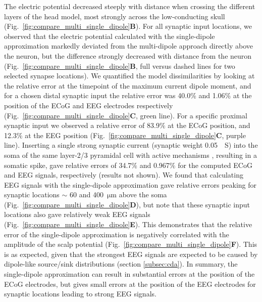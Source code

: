 \documentclass[preprint,10pt,authoryear]{elsarticle}
\newcommand{\newtxt}[1]{{\color{Red}#1}}
\begin{document}
The electric potential decreased steeply with distance when crossing the different layers of the head model, most strongly across the low-conducting skull (Fig.~\ref{fig:compare_multi_single_dipole}\textbf{B}). 
For all synaptic input locations, we observed that the electric potential calculated with the single-dipole approximation markedly deviated from the multi-dipole approach directly above the neuron, but the difference strongly decreased with distance from the neuron 
(Fig.~\ref{fig:compare_multi_single_dipole}\textbf{B}, full versus dashed lines for two selected synapse locations). 
We quantified the model dissimilarities by looking at the relative error at the timepoint of the maximum current dipole moment, and for a chosen distal synaptic input the relative error was 40.0\% and 1.06\% at the position of the ECoG and EEG electrodes respectively (Fig.~\ref{fig:compare_multi_single_dipole}\textbf{C}, green line). For a specific proximal synaptic input we observed a relative error of \newtxt{83.9}$\%$ at the ECoG position, and \newtxt{12.3}$\%$ at the EEG position (Fig.~\ref{fig:compare_multi_single_dipole}\textbf{C}, purple line). Inserting a single strong synaptic current (synaptic weight 0.05~\si{\mu S}) into the soma of the same layer-2/3 pyramidal cell with active mechanisms \citep{EYAL2018}, resulting in a somatic spike, gave relative errors of 34.7$\%$ and 0.967$\%$ for the computed ECoG and EEG signals, respectively (results not shown).
We found that calculating EEG signals with the single-dipole approximation gave relative errors peaking for synaptic locations $\sim$ 60 and 400~$\si{\um}$ above the soma (Fig.~\ref{fig:compare_multi_single_dipole}\textbf{D}),
but note that these synaptic input locations also gave relatively weak EEG signals (Fig.~\ref{fig:compare_multi_single_dipole}\textbf{E}).
This demonstrates that the relative error of the single-dipole approximation is negatively correlated with the amplitude of the scalp potential (Fig.~\ref{fig:compare_multi_single_dipole}\textbf{F}).
This is as expected, given that the strongest EEG signals are expected to be caused by dipole-like source/sink distributions (section \ref{subsec:cda}).
In summary, the single-dipole approximation can result in substantial errors at the position of the ECoG electrodes, but gives small errors at the position of the EEG electrodes for synaptic locations leading to strong EEG signals.
\end{document}
